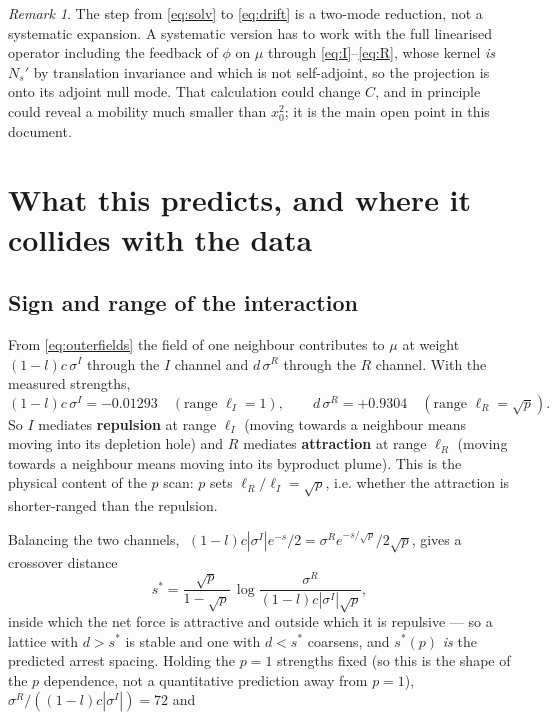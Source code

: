 \documentclass[11pt,a4paper]{article}
\newcommand{\Ns}{N_{s}}
\newcommand{\lI}{\ell_I}
\newcommand{\lR}{\ell_R}
\theoremstyle{plain}
\theoremstyle{remark}
\newtheorem*{rem}{Remark}
\begin{document}
\begin{rem}
The step from \eqref{eq:solv} to \eqref{eq:drift} is a two-mode reduction, not a
systematic expansion. A systematic version has to work with the full linearised
operator including the feedback of $\phi$ on $\mu$ through
\eqref{eq:I}--\eqref{eq:R}, whose kernel \emph{is} $\Ns'$ by translation
invariance and which is not self-adjoint, so the projection is onto its adjoint
null mode. That calculation could change $C$, and in principle could reveal a
mobility much smaller than $x_0^2$; it is the main open point in this document.
\end{rem}

\section{What this predicts, and where it collides with the data}
\label{sec:collide}

\subsection{Sign and range of the interaction}

From \eqref{eq:outerfields} the field of one neighbour contributes to $\mu$ at
weight $(1-l)c\,\sigma^I$ through the $I$ channel and $d\,\sigma^R$ through the
$R$ channel. With the measured strengths,
\[
  (1-l)c\,\sigma^I = -0.01293 \quad(\text{range } \lI = 1), \qquad
  d\,\sigma^R = +0.9304 \quad(\text{range } \lR = \sqrt{p}).
\]
So $I$ mediates \textbf{repulsion} at range $\lI$ (moving towards a neighbour
means moving into its depletion hole) and $R$ mediates \textbf{attraction} at
range $\lR$ (moving towards a neighbour means moving into its byproduct plume).
This is the physical content of the $p$ scan: $p$ sets $\lR/\lI = \sqrt p$, i.e.
whether the attraction is shorter-ranged than the repulsion.

Balancing the two channels, $\;(1-l)c|\sigma^I|e^{-s}/2 = \sigma^R
e^{-s/\sqrt p}/2\sqrt p$, gives a crossover distance
\begin{equation}
  s^{*} = \frac{\sqrt p}{1-\sqrt p}\,
          \log\!\frac{\sigma^R}{(1-l)c|\sigma^I|\sqrt p},
\label{eq:crossover}
\end{equation}
inside which the net force is attractive and outside which it is repulsive ---
so a lattice with $d > s^*$ is stable and one with $d < s^*$ coarsens, and
$s^*(p)$ \emph{is} the predicted arrest spacing. Holding the $p=1$ strengths
fixed (so this is the shape of the $p$ dependence, not a quantitative
prediction away from $p=1$), $\sigma^R/((1-l)c|\sigma^I|) = 72$ and
\end{document}
